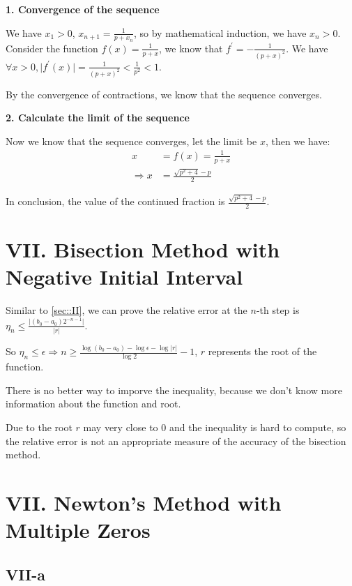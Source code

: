 \documentclass[a4paper]{article}
\begin{document}
\textbf{1. Convergence of the sequence}

We have $x_1 > 0$, $x_{n+1} = \frac{1}{p + x_n}$, so by mathematical induction, we have $x_n > 0$. Consider the function $f(x) = \frac{1}{p+x}$, we know that $f^\prime = -\frac{1}{(p+x)^2}$. We have $\forall x>0, \vert f^\prime(x) \vert = \frac{1}{(p+x)^2} < \frac{1}{p^2} < 1$. 

By the convergence of contractions, we know that the sequence converges.

\textbf{2. Calculate the limit of the sequence}

Now we know that the sequence converges, let the limit be $x$, then we have:
\begin{equation}
  \begin{aligned}
    x &= f(x) = \frac{1}{p+x}\\
    \Rightarrow x &= \frac{\sqrt{p^2+4} - p}{2}
  \end{aligned}
\end{equation}

In conclusion, the value of the continued fraction is $\frac{\sqrt{p^2+4} - p}{2}$.

\section*{VII. Bisection Method with Negative Initial Interval}

Similar to \ref{sec::II}, we can prove the relative error at the $n$-th step is $\eta_n \le \frac{\vert (b_0-a_0)2^{-n-1}\vert}{\vert r \vert} $.

So $\eta_n \le \epsilon \Rightarrow n \ge \frac{\log (b_0-a_0) - \log \epsilon - \log \vert r \vert}{\log 2} - 1$, $r$ represents the root of the function.

There is no better way to imporve the inequality, because we don't know more information about the function and root. 

Due to the root $r$ may very close to $0$ and the inequality is hard to compute, so the relative error is not an appropriate measure of the accuracy of the bisection method.

\section*{VII. Newton's Method with Multiple Zeros}

\subsection*{VII-a}
\label{subsec::VII-a}
\end{document}
